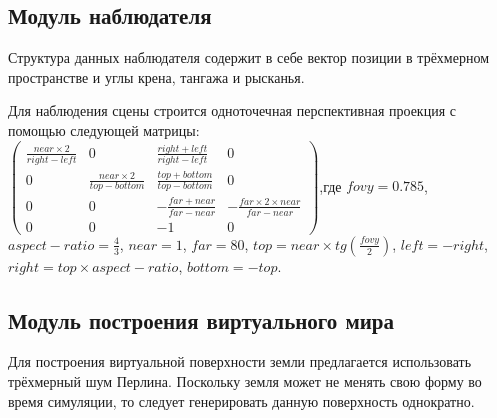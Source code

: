 \subsection{Модуль наблюдателя}

Структура данных наблюдателя содержит в себе вектор позиции в трёхмерном пространстве и углы
крена, тангажа и рысканья.

Для наблюдения сцены строится одноточечная перспективная проекция с помощью следующей матрицы:
\begin{math}
    \begin{pmatrix}
    \frac{near \times 2}{right - left} & 0 & \frac{right + left}{right - left} & 0\\
      0 & \frac{near \times 2}{top - bottom} & \frac{top + bottom}{top - bottom} & 0\\
      0 & 0 & -\frac{far + near}{far - near} & -\frac{far \times 2 \times near}{far - near}\\
     0 & 0 & -1 & 0
    \end{pmatrix}
\end{math},где $fovy = 0.785$,
$aspect-ratio = \frac{4}{3}$,
$near = 1$,
$far = 80$,
$top = near \times tg(\frac{fovy}{2})$,
$left = -right$,
$right = top \times aspect-ratio$,
$bottom = -top$.

\subsection{Модуль построения виртуального мира}

Для построения виртуальной поверхности земли предлагается использовать трёхмерный шум Перлина.
Поскольку земля может не менять свою форму во время симуляции, то следует
генерировать данную поверхность однократно.

